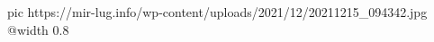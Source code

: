  
 
 
 
 

\ifcmt
  pic https://mir-lug.info/wp-content/uploads/2021/12/20211215_094342.jpg
  @width 0.8
\fi
